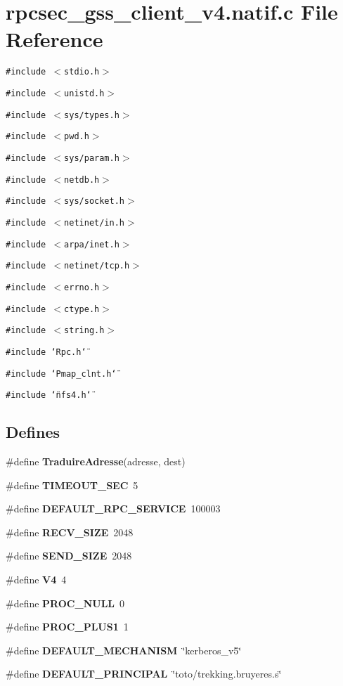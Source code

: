 \section{rpcsec\_\-gss\_\-client\_\-v4.natif.c File Reference}
\label{rpcsec__gss__client__v4_8natif_8c}
{\tt \#include $<$stdio.h$>$}\par
{\tt \#include $<$unistd.h$>$}\par
{\tt \#include $<$sys/types.h$>$}\par
{\tt \#include $<$pwd.h$>$}\par
{\tt \#include $<$sys/param.h$>$}\par
{\tt \#include $<$netdb.h$>$}\par
{\tt \#include $<$sys/socket.h$>$}\par
{\tt \#include $<$netinet/in.h$>$}\par
{\tt \#include $<$arpa/inet.h$>$}\par
{\tt \#include $<$netinet/tcp.h$>$}\par
{\tt \#include $<$errno.h$>$}\par
{\tt \#include $<$ctype.h$>$}\par
{\tt \#include $<$string.h$>$}\par
{\tt \#include \char`\"{}Rpc.h\char`\"{}}\par
{\tt \#include \char`\"{}Pmap\_\-clnt.h\char`\"{}}\par
{\tt \#include \char`\"{}nfs4.h\char`\"{}}\par
\subsection*{Defines}
\begin{CompactItemize}
\item 
\#define {\bf Traduire\-Adresse}(adresse, dest)
\item 
\#define {\bf TIMEOUT\_\-SEC}\ 5
\item 
\#define {\bf DEFAULT\_\-RPC\_\-SERVICE}\ 100003
\item 
\#define {\bf RECV\_\-SIZE}\ 2048
\item 
\#define {\bf SEND\_\-SIZE}\ 2048
\item 
\#define {\bf V4}\ 4
\item 
\#define {\bf PROC\_\-NULL}\ 0
\item 
\#define {\bf PROC\_\-PLUS1}\ 1
\item 
\#define {\bf DEFAULT\_\-MECHANISM}\ \char`\"{}kerberos\_\-v5\char`\"{}
\item 
\#define {\bf DEFAULT\_\-PRINCIPAL}\ \char`\"{}toto/trekking.bruyeres.s\char`\"{}
\end{CompactItemize}
